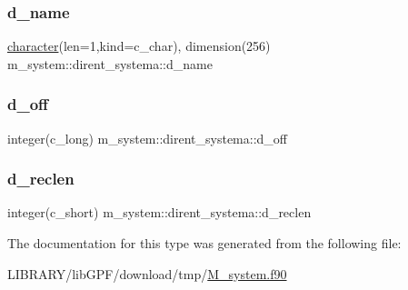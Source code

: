 \subsubsection{\texorpdfstring{d\+\_\+name}{d\_name}}
{\footnotesize\ttfamily \hyperlink{option__stopwatch_83_8txt_abd4b21fbbd175834027b5224bfe97e66}{character}(len=1,kind=c\+\_\+char), dimension(256) m\+\_\+system\+::dirent\+\_\+systema\+::d\+\_\+name\hspace{0.3cm}{\ttfamily [private]}}

\mbox{\label{structm__system_1_1dirent__systema_a4f317f4bd63c3aeca25f5f6df681a7d3}} 
\subsubsection{\texorpdfstring{d\+\_\+off}{d\_off}}
{\footnotesize\ttfamily integer(c\+\_\+long) m\+\_\+system\+::dirent\+\_\+systema\+::d\+\_\+off\hspace{0.3cm}{\ttfamily [private]}}

\mbox{\label{structm__system_1_1dirent__systema_a74c3e2cb9fd26444b7c7837d4ce69baf}} 
\subsubsection{\texorpdfstring{d\+\_\+reclen}{d\_reclen}}
{\footnotesize\ttfamily integer(c\+\_\+short) m\+\_\+system\+::dirent\+\_\+systema\+::d\+\_\+reclen\hspace{0.3cm}{\ttfamily [private]}}



The documentation for this type was generated from the following file\+:\begin{DoxyCompactItemize}
\item 
L\+I\+B\+R\+A\+R\+Y/lib\+G\+P\+F/download/tmp/\hyperlink{M__system_8f90}{M\+\_\+system.\+f90}\end{DoxyCompactItemize}
